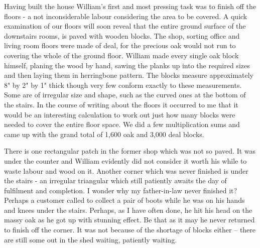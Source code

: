 
Having built the house William's first and most pressing task was to finish off the floors - a not inconsiderable labour considering the area to be covered. A quick examination of our floors will soon reveal that the entire ground surface of the downstairs rooms, is paved with wooden blocks. The shop, sorting office and living room floors were made of deal, for the precious oak would not run to covering the whole of the ground floor. William made every single oak block himself, planing the wood by hand, sawing the planks up into the required sizes and then laying them in herringbone pattern. The blocks measure approximately 8" by 2" by 1" thick though very few conform exactly to these measurements. Some are of irregular size and shape, such as the curved ones at the bottom of the stairs. In the course of writing about the floors it occurred to me that it would be an interesting calculation to work out just how many blocks were needed to cover the entire floor space. We did a few multiplication sums and came up with the grand total of 1,600 oak and 3,000 deal blocks.

There is one rectangular patch in the former shop which was not so paved. It was under the counter and William evidently did not consider it worth his while to waste labour and wood on it. Another corner which was never finished is under the stairs - an irregular triangular which still patiently awaits the day of fulfilment and completion. I wonder why my father-in-law never finished it? Perhaps a customer called to collect a pair of boots while he was on his hands and knees under the stairs. Perhaps, as I have often done, he hit his head on the massy oak as he got up with stunning effect. Be that as it may he never returned to finish off the corner. It was not because of the shortage of blocks either – there are still some out in the shed waiting, patiently waiting.

